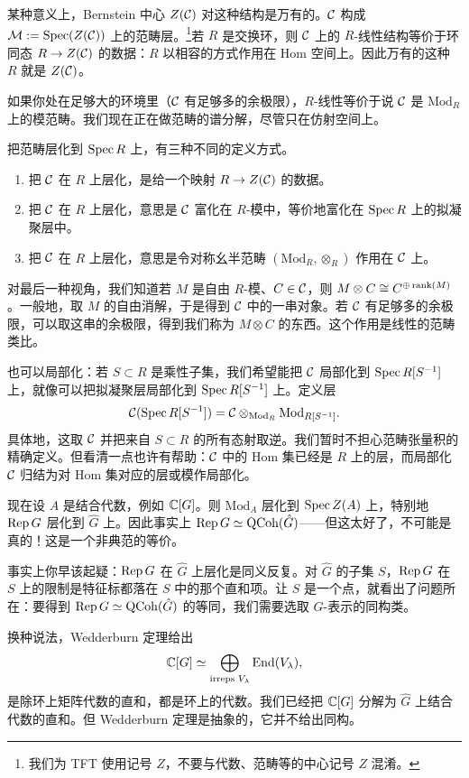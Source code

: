 某种意义上，Bernstein 中心 $Z(\mathcal{C})$ 对这种结构是万有的。$\mathcal{C}$ 构成 $\mathcal{M}:=\operatorname{Spec}(Z(\mathcal{C}))$ 上的范畴层。\footnote{我们为 TFT 使用记号 $Z$，不要与代数、范畴等的中心记号 $Z$ 混淆。}若 $R$ 是交换环，则 $\mathcal{C}$ 上的 $R$-线性结构等价于环同态 $R\to Z(\mathcal{C})$ 的数据：$R$ 以相容的方式作用在 Hom 空间上。因此万有的这种 $R$ 就是 $Z(\mathcal{C})$。

如果你处在足够大的环境里（$\mathcal{C}$ 有足够多的余极限），$R$-线性等价于说 $\mathcal{C}$ 是 $\mathrm{Mod}_R$ 上的模范畴。我们现在正在做范畴的谱分解，尽管只在仿射空间上。

把范畴层化到 $\operatorname{Spec} R$ 上，有三种不同的定义方式。
\begin{enumerate}
\item 把 $\mathcal{C}$ 在 $R$ 上层化，是给一个映射 $R\to Z(\mathcal{C})$ 的数据。
\item 把 $\mathcal{C}$ 在 $R$ 上层化，意思是 $\mathcal{C}$ 富化在 $R$-模中，等价地富化在 $\operatorname{Spec} R$ 上的拟凝聚层中。
\item 把 $\mathcal{C}$ 在 $R$ 上层化，意思是令对称幺半范畴 $(\mathrm{Mod}_R,\otimes_R)$ 作用在 $\mathcal{C}$ 上。
\end{enumerate}


对最后一种视角，我们知道若 $M$ 是自由 $R$-模、$C\in\mathcal{C}$，则 $M\otimes C\cong C^{\oplus\operatorname{rank}(M)}$。一般地，取 $M$ 的自由消解，于是得到 $\mathcal{C}$ 中的一串对象。若 $\mathcal{C}$ 有足够多的余极限，可以取这串的余极限，得到我们称为 $M\otimes C$ 的东西。这个作用是线性的范畴类比。

也可以局部化：若 $S\subset R$ 是乘性子集，我们希望能把 $\mathcal{C}$ 局部化到 $\operatorname{Spec} R[S^{-1}]$ 上，就像可以把拟凝聚层局部化到 $\operatorname{Spec} R[S^{-1}]$ 上。定义层
\[
\mathcal{C}(\operatorname{Spec} R[S^{-1}])=\mathcal{C}\otimes_{\mathrm{Mod}_R}\mathrm{Mod}_{R[S^{-1}]}.
\]
具体地，这取 $\mathcal{C}$ 并把来自 $S\subset R$ 的所有态射取逆。我们暂时不担心范畴张量积的精确定义。但看清一点也许有帮助：$\mathcal{C}$ 中的 Hom 集已经是 $R$ 上的层，而局部化 $\mathcal{C}$ 归结为对 Hom 集对应的层或模作局部化。

现在设 $A$ 是结合代数，例如 $\mathbb{C}[G]$。则 $\mathrm{Mod}_A$ 层化到 $\operatorname{Spec} Z(A)$ 上，特别地 $\operatorname{Rep} G$ 层化到 $\hat G$ 上。因此事实上 $\operatorname{Rep} G\simeq\mathrm{QCoh}(\hat G)$——但这太好了，不可能是真的！这是一个非典范的等价。

事实上你早该起疑：$\operatorname{Rep} G$ 在 $\hat G$ 上层化是同义反复。对 $\hat G$ 的子集 $S$，$\operatorname{Rep} G$ 在 $S$ 上的限制是特征标都落在 $S$ 中的那个直和项。让 $S$ 是一个点，就看出了问题所在：要得到 $\operatorname{Rep} G\simeq\mathrm{QCoh}(\hat G)$ 的等同，我们需要选取 $G$-表示的同构类。

换种说法，Wedderburn 定理给出
\[
\mathbb{C}[G]\simeq\bigoplus_{\text{irreps }V_\lambda}\operatorname{End}(V_\lambda),
\]
是除环上矩阵代数的直和，都是环上的代数。我们已经把 $\mathbb{C}[G]$ 分解为 $\hat G$ 上结合代数的直和。但 Wedderburn 定理是抽象的，它并不给出同构。

